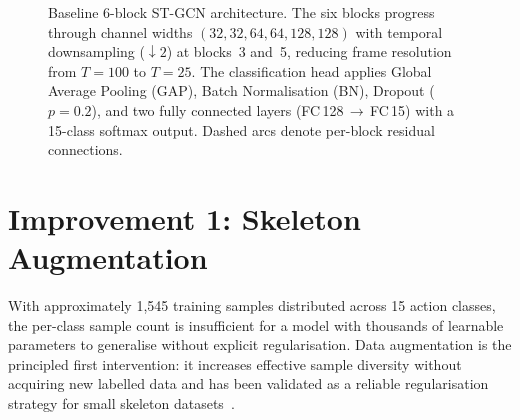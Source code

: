 \begin{figure}[htbp]
{
}%
\caption{Baseline 6-block ST-GCN architecture. The six blocks progress through channel widths $(32, 32, 64, 64, 128, 128)$ with temporal downsampling (${\downarrow}2$) at blocks~3 and~5, reducing frame resolution from $T\!=\!100$ to $T\!=\!25$. The classification head applies Global Average Pooling (GAP), Batch Normalisation (BN), Dropout ($p=0.2$), and two fully connected layers (FC\,128\,$\to$\,FC\,15) with a 15-class softmax output. Dashed arcs denote per-block residual connections.}
\label{fig:baseline-arch}
\end{figure}

\section{Improvement 1: Skeleton Augmentation}
\label{sec:aug-rationale}

With approximately 1,545 training samples distributed across 15 action classes, the per-class sample count is insufficient for a model with thousands of learnable parameters to generalise without explicit regularisation. Data augmentation is the principled first intervention: it increases effective sample diversity without acquiring new labelled data and has been validated as a reliable regularisation strategy for small skeleton datasets~\cite{xin2024enhancing, shorten2019survey}.

